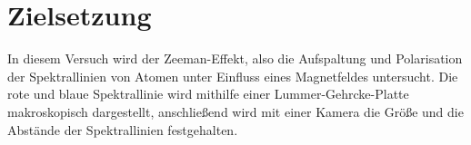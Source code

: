 \section{Zielsetzung}
\label{sec:Zielsetzung}
In diesem Versuch wird der Zeeman-Effekt, also die Aufspaltung und Polarisation der Spektrallinien von Atomen unter Einfluss eines Magnetfeldes untersucht.
Die rote und blaue Spektrallinie wird mithilfe einer Lummer-Gehrcke-Platte makroskopisch dargestellt, anschließend wird mit einer Kamera die Größe und die Abstände der Spektrallinien festgehalten.